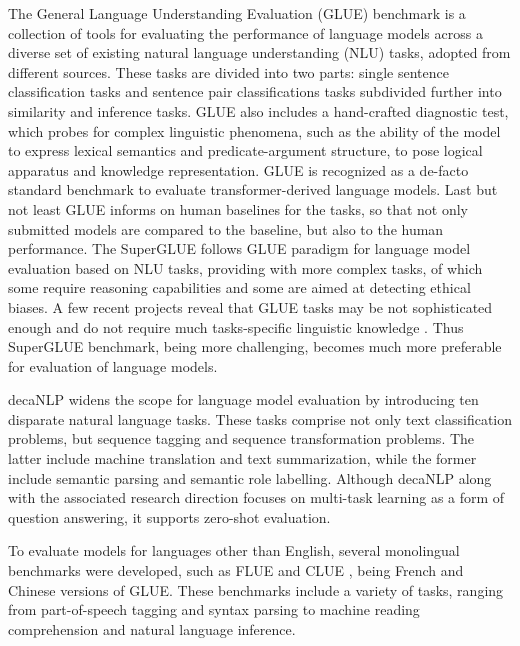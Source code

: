 \documentclass[11pt,a4paper]{article}
\begin{document}
The General Language Understanding Evaluation (GLUE) \cite{wang2018glue} benchmark is a collection of tools for evaluating the performance of language models across a diverse set of existing natural language understanding (NLU) tasks, adopted from different sources. These tasks are divided into two parts: single sentence classification tasks and sentence pair classifications tasks subdivided further into similarity and inference tasks. GLUE also includes a hand-crafted diagnostic test, which probes for complex linguistic phenomena, such as the ability of the model to express lexical semantics and predicate-argument structure, to pose logical apparatus and knowledge representation. GLUE  is recognized as a de-facto standard benchmark to evaluate transformer-derived language models. Last but not least GLUE informs on human baselines for the tasks, so that not only submitted models are compared to the baseline, but also to the human performance. The SuperGLUE \cite{wang2019superglue} follows GLUE paradigm for language model evaluation based on NLU tasks, providing with more complex tasks, of which some require reasoning capabilities and some are aimed at detecting ethical biases. A few recent projects reveal that GLUE tasks may be not sophisticated enough and do not require much tasks-specific linguistic knowledge \cite{kovaleva2019revealing,warstadt2019investigating}. Thus SuperGLUE benchmark, being more challenging,  becomes much more preferable for evaluation of language models. 

decaNLP \cite{McCann2018decaNLP} widens the scope for language model evaluation by introducing ten disparate natural language tasks. These tasks comprise not only text classification problems, but sequence tagging and sequence transformation problems. The latter include machine translation and text summarization, while the former include semantic parsing and semantic role labelling. Although decaNLP along with the associated research direction focuses on multi-task learning as a form of question answering, it supports zero-shot evaluation. 

To evaluate models for languages other than English, several monolingual benchmarks were developed, such as FLUE \cite{le2019flaubert} and CLUE \cite{CLUE}, being French and Chinese versions of GLUE. These benchmarks include a variety of tasks, ranging from part-of-speech tagging and syntax parsing to machine reading comprehension and natural language inference. 
\end{document}
